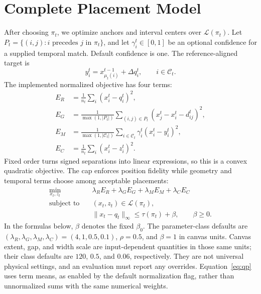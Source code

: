 \documentclass{vgtc}                %
\begin{document}
\section{Complete Placement Model}\label{sec:placement}
After choosing $\pi_t$, we optimize anchors and interval centers over $\mathcal{L}(\pi_t)$. Let $P_t=\{(i,j):i\text{ precedes }j\text{ in }\pi_t\}$, and let $\gamma_i^t\in[0,1]$ be an optional confidence for a supplied temporal match. Default confidence is one. The reference-aligned target is
\[
 y_i^t=x_{\mu_t(i)}^{t-1}+\Delta q_i^t,\qquad i\in\mathcal{C}_t.
\]
The implemented normalized objective has four terms:
\begin{equation}\label{eq:qpterms}
\begin{aligned}
 E_R&=\frac1{n_t}\sum_i(x_i^t-q_i^t)^2,\\
 E_G&=\frac1{\max(1,|P_t|)}\sum_{(i,j)\in P_t}
                 (x_j^t-x_i^t-d_{ij}^t)^2,\\
 E_M&=\frac1{\max(1,|\mathcal{C}_t|)}\sum_{i\in\mathcal{C}_t}
                     \gamma_i^t(x_i^t-y_i^t)^2,\\
 E_C&=\frac1{n_t}\sum_i(x_i^t-z_i^t)^2.
\end{aligned}
\end{equation}
Fixed order turns signed separations into linear expressions, so this is a convex quadratic objective. The cap enforces position fidelity while geometry and temporal terms choose among acceptable placements:
\begin{equation}\label{eq:qp}
\begin{aligned}
 \min_{x_t,z_t}\quad&\lambda_R E_R+\lambda_G E_G+
                       \lambda_M E_M+\lambda_C E_C\\
 \text{subject to}\quad&(x_t,z_t)\in\mathcal{L}(\pi_t),\\
 &\|x_t-q_t\|_\infty\le\tau(\pi_t)+\beta,\qquad\beta\ge0.
\end{aligned}
\end{equation}
In the formulas below, $\beta$ denotes the fixed $\beta_0$. The parameter-class defaults are $(\lambda_R,\lambda_G,\lambda_M,\lambda_C)=(4,1,0.5,0.1)$, $\rho=0.5$, and $\beta=1$ in canvas units. Canvas extent, gap, and width scale are input-dependent quantities in those same units; their class defaults are $120$, $0.5$, and $0.06$, respectively. They are not universal physical settings, and an evaluation must report any overrides. Equation~\ref{eq:qp} uses term means, as enabled by the default normalization flag, rather than unnormalized sums with the same numerical weights.
\end{document}
